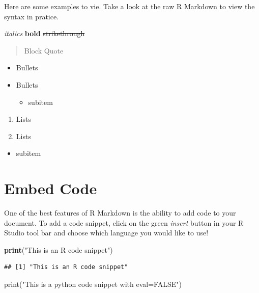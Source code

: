 \documentclass[]{book}
\newenvironment{Shaded}{\begin{snugshade}}{\end{snugshade}}
\newcommand{\BuiltInTok}[1]{#1}
\newcommand{\KeywordTok}[1]{\textcolor[rgb]{0.13,0.29,0.53}{\textbf{#1}}}
\newcommand{\NormalTok}[1]{#1}
\newcommand{\StringTok}[1]{\textcolor[rgb]{0.31,0.60,0.02}{#1}}
\providecommand{\tightlist}{%
  \setlength{\itemsep}{0pt}\setlength{\parskip}{0pt}}
\begin{document}
Here are some examples to vie. Take a look at the raw R Markdown to view the syntax in pratice.

\emph{italics}
\textbf{bold}
\sout{strikethrough}

\begin{quote}
Block Quote
\end{quote}

\begin{itemize}
\tightlist
\item
  Bullets
\item
  Bullets

  \begin{itemize}
  \tightlist
  \item
    subitem
  \end{itemize}
\end{itemize}

\begin{enumerate}
\def\labelenumi{\arabic{enumi}.}
\tightlist
\item
  Lists
\item
  Lists
\end{enumerate}

\begin{itemize}
\tightlist
\item
  subitem
\end{itemize}

\hypertarget{embed-code}{%
\section{Embed Code}\label{embed-code}}

One of the best features of R Markdown is the ability to add code to your document. To add a code snippet, click on the green \emph{insert} button in your R Studio tool bar and choose which language you would like to use!

\begin{Shaded}
\begin{Highlighting}[]
\KeywordTok{print}\NormalTok{(}\StringTok{"This is an R code snippet"}\NormalTok{)}
\end{Highlighting}
\end{Shaded}

\begin{verbatim}
## [1] "This is an R code snippet"
\end{verbatim}

\begin{Shaded}
\begin{Highlighting}[]
\BuiltInTok{print}\NormalTok{(}\StringTok{"This is a python code snippet with eval=FALSE"}\NormalTok{)}
\end{Highlighting}
\end{Shaded}
\end{document}
